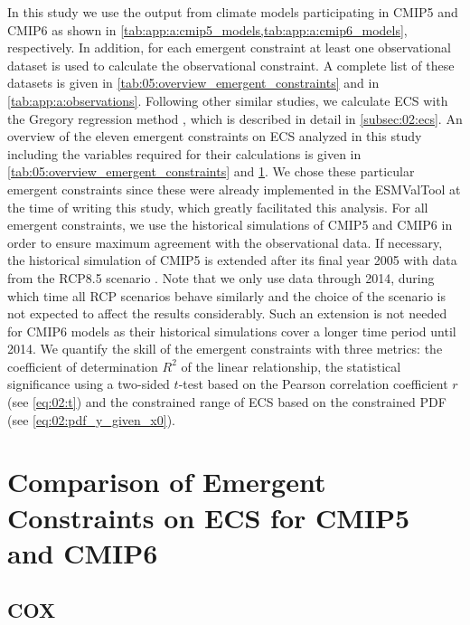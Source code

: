 In this study we use the output from climate models participating in
\acs{CMIP}5 and \acs{CMIP}6 as shown in
\cref{tab:app:a:cmip5_models,tab:app:a:cmip6_models}, respectively. In
addition, for each emergent constraint at least one observational dataset is
used to calculate the observational constraint. A complete list of these
datasets is given in \cref{tab:05:overview_emergent_constraints} and in
\cref{tab:app:a:observations}. Following other similar studies, we calculate
\ac{ECS} with the Gregory regression method \autocite{Gregory2004}, which is
described in detail in \cref{subsec:02:ecs}. An overview of the eleven emergent
constraints on \ac{ECS} analyzed in this study including the variables required
for their calculations is given in \cref{tab:05:overview_emergent_constraints}
and \cref{sec:05:comparison_of_emergent_constraints}. We chose these particular
emergent constraints since these were already implemented in the
\ac{ESMValTool} at the time of writing this study, which greatly facilitated
this analysis. For all emergent constraints, we use the historical simulations
of \acs{CMIP}5 and \acs{CMIP}6 in order to ensure maximum agreement with the
observational data. If necessary, the historical simulation of \acs{CMIP}5 is
extended after its final year 2005 with data from the \acs{RCP}8.5 scenario
\autocite{Riahi2011}. Note that we only use data through 2014, during which
time all \ac{RCP} scenarios behave similarly and the choice of the scenario is
not expected to affect the results considerably. Such an extension is not
needed for \acs{CMIP}6 models as their historical simulations cover a longer
time period until 2014. We quantify the skill of the emergent constraints with
three metrics: the coefficient of determination $R^2$ of the linear
relationship, the statistical significance using a two-sided $t$-test based on
the Pearson correlation coefficient $r$ (see \cref{eq:02:t}) and the
constrained range of \ac{ECS} based on the constrained \ac{PDF} (see
\cref{eq:02:pdf_y_given_x0}).


\section{Comparison of Emergent Constraints on \acs{ECS} for \acs{CMIP}5 and
  \acs{CMIP}6}
\label{sec:05:comparison_of_emergent_constraints}


\subsection{COX}
\label{subsec:05:cox}

